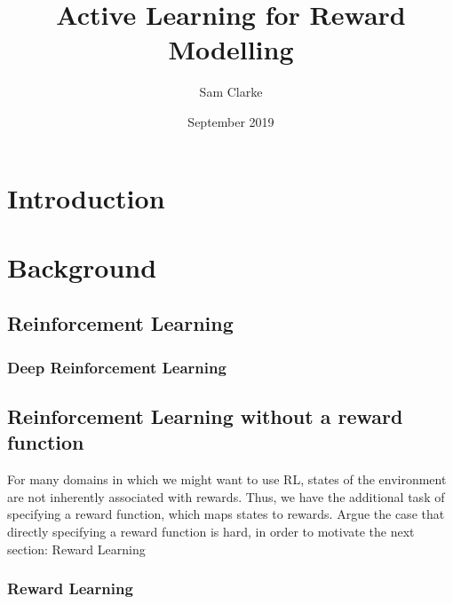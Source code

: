 \documentclass[11pt, a4paper, bibliography=totoc]{report}
\begin{document}
\title{Active Learning for Reward Modelling}
\author{Sam Clarke}
\date{September 2019}
\renewcommand{\bibname}{References}
\maketitle

\begin{abstract} %

\end{abstract}

\tableofcontents

\chapter{Introduction}

\chapter{Background} %
\section{Reinforcement Learning}
\subsection{Deep Reinforcement Learning}

\section{Reinforcement Learning without a reward function}
For many domains in which we might want to use RL, states of the environment are not inherently associated with rewards.  Thus, we have the additional task of specifying a reward function, which maps states to rewards. Argue the case that directly specifying a reward function is hard, in order to motivate the next section: Reward Learning
\subsection{Reward Learning}
\end{document}
